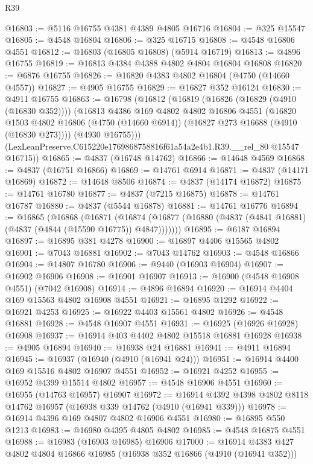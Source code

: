 \begin{lexlean}{R39}
\begin{coremodule}
@16803 := @5116 @16755 @4381 @4389 @4805 @16716
@16804 := @325 @15547
@16805 := @4548 @16804
@16806 := @325 @16715
@16808 := @4548 @16806 @4551
@16812 := @16803 (@16805 @16808) (@5914 @16719)
@16813 := @4896 @16755
@16819 := @16813 @4384 @4388 @4802 @4804 @16804 @16808
@16820 := @6876 @16755
@16826 := @16820 @4383 @4802 @16804 (@4750 (@14660 @4557))
@16827 := @4905 @16755
@16829 := @16827 @352 @16124
@16830 := @4911 @16755
@16863 := @16798
    (@16812
      (@16819
        (@16826 (@16829 (@4910 (@16830 @352))))
        (@16813
          @4386
          @169
          @4802
          @4802
          @16806
          @4551
          (@16820
            @1503
            @4802
            @16806
            (@4750 (@14660 @6914))
            (@16827 @273 @16688 (@4910 (@16830 @273))))
          (@4930 @16755)))
      (LexLeanPreserve.C615220e1769868758816f61a54a2e4b1.R39.__rel_80 @15547 @16715))
@16865 := @4837 (@16748 @14762)
@16866 := @14648 @4569
@16868 := @4837 (@16751 @16866)
@16869 := @14761 @6914
@16871 := @4837 (@14171 @16869)
@16872 := @14648 @8506
@16874 := @4837 (@14174 @16872)
@16875 := @14761 @16780
@16877 := @4837 (@7215 @16875)
@16878 := @14761 @16787
@16880 := @4837 (@5544 @16878)
@16881 := @14761 @16776
@16894 := @16865
    (@16868
      (@16871
        (@16874 (@16877 (@16880 (@4837 (@4841 @16881) (@4837 (@4844 (@15590 @16775)) @4847)))))))
@16895 := @6187 @16894
@16897 := @16895 @381 @4278
@16900 := @16897 @4406 @15565 @4802
@16901 := @7043 @16881
@16902 := @7043 @14762
@16903 := @4548 @16866
@16904 := @14807 @16780
@16906 := @9440 (@16903 @16904)
@16907 := @16902 @16906
@16908 := @16901 @16907
@16913 := @16900 (@4548 @16908 @4551) (@7042 @16908)
@16914 := @4896 @16894
@16920 := @16914 @4404 @169 @15563 @4802 @16908 @4551
@16921 := @16895 @1292
@16922 := @16921 @4253
@16925 := @16922 @4403 @15561 @4802
@16926 := @4548 @16881
@16928 := @4548 @16907 @4551
@16931 := @16925 (@16926 @16928) @16908
@16937 := @16914 @403 @4402 @4802 @15518 @16881 @16928
@16938 := @4905 @16894
@16940 := @16938 @24 @16881
@16941 := @4911 @16894
@16945 := @16937 (@16940 (@4910 (@16941 @24)))
@16951 := @16914 @4400 @169 @15516 @4802 @16907 @4551
@16952 := @16921 @4252
@16955 := @16952 @4399 @15514 @4802
@16957 := @4548 @16906 @4551
@16960 := @16955 (@14763 @16957) @16907
@16972 := @16914 @4392 @4398 @4802 @8118 @14762 @16957 (@16938 @339 @14762 (@4910 (@16941 @339)))
@16978 := @16914 @4396 @169 @4807 @4802 @16906 @4551
@16980 := @16895 @550 @1213
@16983 := @16980 @4395 @4805 @4802
@16985 := @4548 @16875 @4551
@16988 := @16983 (@16903 @16985) @16906
@17000 := @16914 @4383 @427 @4802 @4804 @16866 @16985 (@16938 @352 @16866 (@4910 (@16941 @352)))

\end{coremodule}
\end{lexlean}
